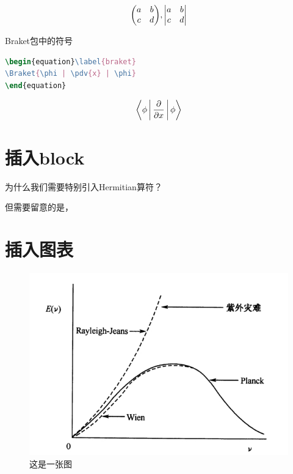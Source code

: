 \documentclass[11pt,a4paper,onecolumn]{article}
\begin{document}
\begin{equation}\label{key}
\mqty( a & b \\ c & d ), \mqty| a & b \\ c & d |
\end{equation}

Braket包中的符号
\begin{lstlisting}[language=TeX]
\begin{equation}\label{braket}
\Braket{\phi | \pdv{x} | \phi}
\end{equation}
\end{lstlisting}

\begin{equation}\label{braket}
\Braket{\phi | \pdv{x} | \phi}
\end{equation}


\section{插入block}



\begin{note}
	为什么我们需要特别引入Hermitian算符？\\
	\lipsum[1]
\end{note}

\begin{warning}
	但需要留意的是，\lipsum[2]
\end{warning}

\section{插入图表}
\begin{figure}[H]
	\centering
	\includegraphics[scale=0.8]{fig/blacknu.jpg}
	\caption{这是一张图}
\end{figure}
\end{document}
